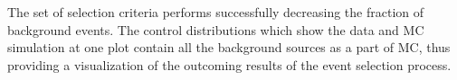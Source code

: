 The set of selection criteria performs successfully decreasing the fraction of background events. The control distributions which show the data and MC simulation at one plot
contain all the background sources as a part of MC, thus providing a visualization of the outcoming results of the event selection process. 